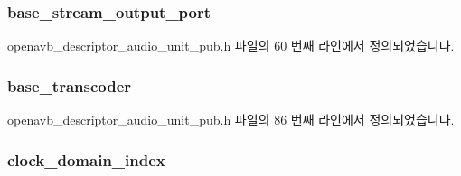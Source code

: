 \subsubsection[{\texorpdfstring{base\+\_\+stream\+\_\+output\+\_\+port}{base_stream_output_port}}]{ base\+\_\+stream\+\_\+output\+\_\+port}\hypertarget{structopenavb__aem__descriptor__audio__unit__t_a480138069b93fdd1e7a7842850553821}{}\label{structopenavb__aem__descriptor__audio__unit__t_a480138069b93fdd1e7a7842850553821}


openavb\+\_\+descriptor\+\_\+audio\+\_\+unit\+\_\+pub.\+h 파일의 60 번째 라인에서 정의되었습니다.

\subsubsection[{\texorpdfstring{base\+\_\+transcoder}{base_transcoder}}]{ base\+\_\+transcoder}\hypertarget{structopenavb__aem__descriptor__audio__unit__t_a7cf3378163dcc76a0d6c9c081f338dc5}{}\label{structopenavb__aem__descriptor__audio__unit__t_a7cf3378163dcc76a0d6c9c081f338dc5}


openavb\+\_\+descriptor\+\_\+audio\+\_\+unit\+\_\+pub.\+h 파일의 86 번째 라인에서 정의되었습니다.

\subsubsection[{\texorpdfstring{clock\+\_\+domain\+\_\+index}{clock_domain_index}}]{ clock\+\_\+domain\+\_\+index}\hypertarget{structopenavb__aem__descriptor__audio__unit__t_a6bf82a91e71555466bdcba713002b1ff}{}\label{structopenavb__aem__descriptor__audio__unit__t_a6bf82a91e71555466bdcba713002b1ff}


